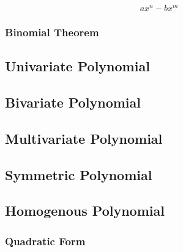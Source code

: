 \[
  a x^n - b x^m
\]


\subsubsection{Binomial Theorem}\label{sec:binomial_theorem}



\subsection{Univariate Polynomial}\label{sec:univariate_polynomial}

\subsection{Bivariate Polynomial}\label{sec:bivariate_polynomial}

\subsection{Multivariate Polynomial}\label{sec:multivariate_polynomial}

\subsection{Symmetric Polynomial}\label{sec:symmetric_polynomial}

\subsection{Homogenous Polynomial}\label{sec:homogenous_polynomial}

\subsubsection{Quadratic Form}\label{sec:quadratic_form}

